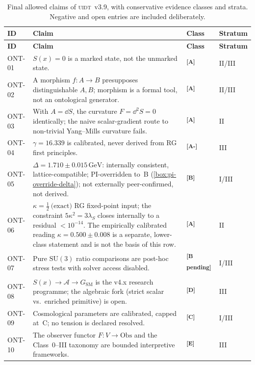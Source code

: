 \documentclass[12pt,a4paper,twoside]{article}
\theoremstyle{plain}
\theoremstyle{definition}
\theoremstyle{remark}
\newcommand{\UIDT}{\textsc{uidt}}
\newcommand{\GeV}{\,\mathrm{GeV}}
\newcommand{\catmark}[1]{\textsuperscript{\textsf{\textbf{[#1]}}}}
\newcommand{\DeltaGap}{1.710 \pm 0.015\GeV} %
\newcommand{\GammaGeom}{16.339} %
\newcommand{\KappaRG}{\tfrac{1}{2}\ \text{(exact)}} %
\begin{document}
{\small
\renewcommand{\arraystretch}{1.3}
\begin{longtable}{p{} p{} p{} p{}}
\caption{Final allowed claims of \UIDT\ v3.9, with conservative evidence classes
and strata. Negative and open entries are included deliberately.}
\label{tab:claims}\\
\toprule
\textbf{ID} & \textbf{Claim} & \textbf{Class} & \textbf{Stratum} \\
\midrule
\endfirsthead
\toprule
\textbf{ID} & \textbf{Claim} & \textbf{Class} & \textbf{Stratum} \\
\midrule
\endhead
\bottomrule
\endfoot
ONT-01 & $S(x)=0$ is a marked state, not the unmarked state. & \catmark{A} & II/III \\
ONT-02 & A morphism $f\colon A\to B$ presupposes distinguishable $A,B$; morphism is a formal tool, not an ontological generator. & \catmark{A} & II/III \\
ONT-03 & With $A=\dd S$, the curvature $F=\dd^2 S=0$ identically; the naive scalar-gradient route to non-trivial Yang--Mills curvature fails. & \catmark{A} & II \\
ONT-04 & $\gamma = \GammaGeom$ is calibrated, never derived from RG first principles. & \catmark{A-} & III \\
ONT-05 & $\Delta = \DeltaGap$: internally consistent, lattice-compatible; PI-overridden to~B (\cref{box:pi-override-delta}); not externally peer-confirmed, not derived. & \catmark{B} & I/III \\
ONT-06 & $\kappa = \KappaRG$ RG fixed-point input; the constraint $5\kappa^2 = 3\lambda_S$ closes internally to a residual $<10^{-14}$. The empirically calibrated reading $\kappa = 0.500 \pm 0.008$ is a separate, lower-class statement and is not the basis of this row. & \catmark{A} & II \\
ONT-07 & Pure $\mathrm{SU}(3)$ ratio comparisons are post-hoc stress tests with solver access disabled. & \catmark{B\,pending} & I/III \\
ONT-08 & $S(x)\to\mathcal{A}\to G_{\mathrm{SM}}$ is the v4.x research programme; the algebraic fork (strict scalar vs.\ enriched primitive) is open. & \catmark{D} & III \\
ONT-09 & Cosmological parameters are calibrated, capped at~C; no tension is declared resolved. & \catmark{C} & I/III \\
ONT-10 & The observer functor $F\colon V\to\mathrm{Obs}$ and the Class~0--III taxonomy are bounded interpretive frameworks. & \catmark{E} & III \\
\bottomrule
\end{longtable}
}
\end{document}
